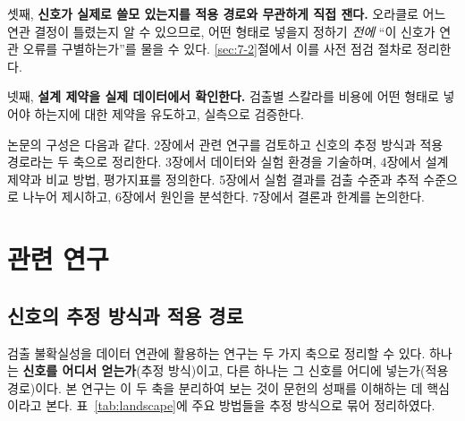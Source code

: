 \documentclass[12pt,a4paper,oneside]{report}
\begin{document}
셋째, \textbf{신호가 실제로 쓸모 있는지를 적용 경로와 무관하게 직접 잰다.} 오라클로 어느 연관 결정이 틀렸는지 알 수 있으므로, 어떤 형태로 넣을지 정하기 \textit{전에} ``이 신호가 연관 오류를 구별하는가''를 물을 수 있다. \ref{sec:7-2}절에서 이를 사전 점검 절차로 정리한다.

넷째, \textbf{설계 제약을 실제 데이터에서 확인한다.} 검출별 스칼라를 비용에 어떤 형태로 넣어야 하는지에 대한 제약을 유도하고, 실측으로 검증한다.

논문의 구성은 다음과 같다. 2장에서 관련 연구를 검토하고 신호의 추정 방식과 적용 경로라는 두 축으로 정리한다. 3장에서 데이터와 실험 환경을 기술하며, 4장에서 설계 제약과 비교 방법, 평가지표를 정의한다. 5장에서 실험 결과를 검출 수준과 추적 수준으로 나누어 제시하고, 6장에서 원인을 분석한다. 7장에서 결론과 한계를 논의한다.

\chapter{관련 연구}

\section{신호의 추정 방식과 적용 경로}\label{sec:2-1}

검출 불확실성을 데이터 연관에 활용하는 연구는 두 가지 축으로 정리할 수 있다. 하나는 \textbf{신호를 어디서 얻는가}(추정 방식)이고, 다른 하나는 그 신호를 어디에 넣는가(적용 경로)이다. 본 연구는 이 두 축을 분리하여 보는 것이 문헌의 성패를 이해하는 데 핵심이라고 본다. 표~\ref{tab:landscape}에 주요 방법들을 추정 방식으로 묶어 정리하였다.
\end{document}
